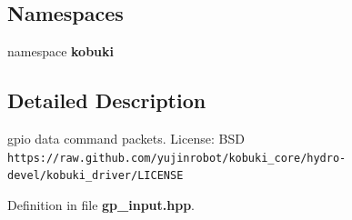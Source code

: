 \subsection*{\-Namespaces}
\begin{DoxyCompactItemize}
\item 
namespace {\bf kobuki}
\end{DoxyCompactItemize}


\subsection{\-Detailed \-Description}
gpio data command packets. \-License\-: \-B\-S\-D {\tt https\-://raw.\-github.\-com/yujinrobot/kobuki\-\_\-core/hydro-\/devel/kobuki\-\_\-driver/\-L\-I\-C\-E\-N\-S\-E} 

\-Definition in file {\bf gp\-\_\-input.\-hpp}.

